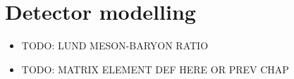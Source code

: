 \section{Detector modelling} %
\label{sub:detector_modelling}






\begin{itemize}
	\item TODO: LUND MESON-BARYON RATIO
	\item TODO: MATRIX ELEMENT DEF HERE OR PREV CHAP
\end{itemize}
